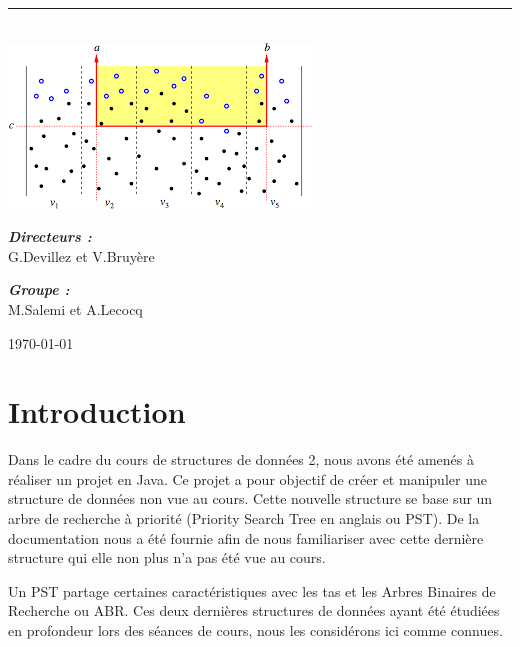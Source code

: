 \documentclass[10pt,a4paper]{article}
\newcommand{\HRule}{\rule{\linewidth}{0.5mm}}
\begin{document}
\begin{titlepage}
\begin{sffamily}
\begin{center}
    \HRule \\[2cm]
    \includegraphics[scale=0.50]{images/window.png}
    \\[2cm]

    \begin{minipage}{0.4\textwidth}
      \begin{flushleft} \large
        \emph{\textbf{Directeurs :}}\\ G.Devillez et V.Bruyère\\
      \end{flushleft}
    \end{minipage}
    \begin{minipage}{0.4\textwidth}
      \begin{flushright} \large
        \emph{\textbf{Groupe :}}\\ M.Salemi et A.Lecocq
      \end{flushright}
    \end{minipage}

    \vfill

    {\large \today}

  \end{center}
  \end{sffamily}
\end{titlepage}

\newpage
\tableofcontents
\newpage
\section{Introduction}
Dans le cadre du cours de structures de données 2, nous avons été amenés à réaliser un projet en Java. Ce projet a pour objectif de créer et manipuler une structure de données non vue au cours. Cette nouvelle structure se base sur un arbre de recherche à priorité (Priority Search Tree en anglais ou PST). De la documentation nous a été fournie afin de nous familiariser avec cette dernière structure qui elle non plus n'a pas été vue au cours.

Un PST partage certaines caractéristiques avec les tas et les Arbres Binaires de Recherche ou ABR. Ces deux dernières structures de données ayant été étudiées en profondeur lors des séances de cours, nous les considérons ici comme connues.
\end{document}
